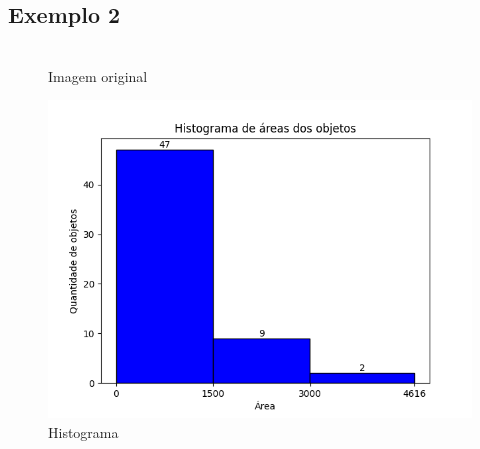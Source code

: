 \documentclass[12pt, letterpaper]{article}
\begin{document}
    \subsection{Exemplo 2}
    \begin{figure}[H]
    \centering
    \begin{minipage}{.45\textwidth}
        \centering
        \\ {Imagem original}
    \end{minipage}
    \begin{minipage}{.5\textwidth}
        \centering
        {\includegraphics[width=1\linewidth]{processed/objetos2/histogram.png}}
        \\ {Histograma}
    \end{minipage}
    \end{figure}
\end{document}
